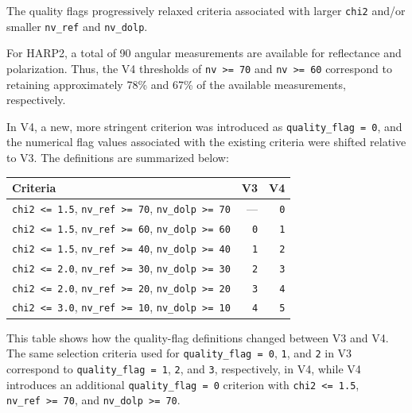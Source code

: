 \documentclass[
  11pt,
  letterpaper,
]{scrreprt}
\begin{document}
The quality flags progressively relaxed criteria associated with larger
\texttt{chi2} and/or smaller \texttt{nv\_ref} and \texttt{nv\_dolp}.

For HARP2, a total of 90 angular measurements are available for
reflectance and polarization. Thus, the V4 thresholds of
\texttt{nv\ \textgreater{}=\ 70} and \texttt{nv\ \textgreater{}=\ 60}
correspond to retaining approximately 78\% and 67\% of the available
measurements, respectively.

In V4, a new, more stringent criterion was introduced as
\texttt{quality\_flag\ =\ 0}, and the numerical flag values associated
with the existing criteria were shifted relative to V3. The definitions
are summarized below:

\begin{longtable}[]{@{}lrr@{}}
\toprule\noalign{}
Criteria & V3 & V4 \\
\midrule\noalign{}
\endhead
\bottomrule\noalign{}
\endlastfoot
\texttt{chi2\ \textless{}=\ 1.5}, \texttt{nv\_ref\ \textgreater{}=\ 70},
\texttt{nv\_dolp\ \textgreater{}=\ 70} & --- & \texttt{0} \\
\texttt{chi2\ \textless{}=\ 1.5}, \texttt{nv\_ref\ \textgreater{}=\ 60},
\texttt{nv\_dolp\ \textgreater{}=\ 60} & \texttt{0} & \texttt{1} \\
\texttt{chi2\ \textless{}=\ 1.5}, \texttt{nv\_ref\ \textgreater{}=\ 40},
\texttt{nv\_dolp\ \textgreater{}=\ 40} & \texttt{1} & \texttt{2} \\
\texttt{chi2\ \textless{}=\ 2.0}, \texttt{nv\_ref\ \textgreater{}=\ 30},
\texttt{nv\_dolp\ \textgreater{}=\ 30} & \texttt{2} & \texttt{3} \\
\texttt{chi2\ \textless{}=\ 2.0}, \texttt{nv\_ref\ \textgreater{}=\ 20},
\texttt{nv\_dolp\ \textgreater{}=\ 20} & \texttt{3} & \texttt{4} \\
\texttt{chi2\ \textless{}=\ 3.0}, \texttt{nv\_ref\ \textgreater{}=\ 10},
\texttt{nv\_dolp\ \textgreater{}=\ 10} & \texttt{4} & \texttt{5} \\
\end{longtable}

This table shows how the quality-flag definitions changed between V3 and
V4. The same selection criteria used for \texttt{quality\_flag\ =\ 0},
\texttt{1}, and \texttt{2} in V3 correspond to
\texttt{quality\_flag\ =\ 1}, \texttt{2}, and \texttt{3}, respectively,
in V4, while V4 introduces an additional \texttt{quality\_flag\ =\ 0}
criterion with \texttt{chi2\ \textless{}=\ 1.5},
\texttt{nv\_ref\ \textgreater{}=\ 70}, and
\texttt{nv\_dolp\ \textgreater{}=\ 70}.
\end{document}
